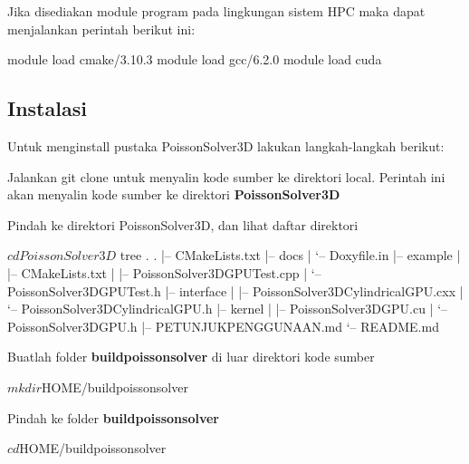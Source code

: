 Jika disediakan module program pada lingkungan sistem H\+PC maka dapat menjalankan perintah berikut ini\+:


\begin{DoxyCode}
module load cmake/3.10.3
module load gcc/6.2.0
module load cuda
\end{DoxyCode}
 \subsection*{Instalasi}

Untuk menginstall pustaka Poisson\+Solver3D lakukan langkah-\/langkah berikut\+:


\begin{DoxyEnumerate}
\item Jalankan git clone untuk menyalin kode sumber ke direktori local. Perintah ini akan menyalin kode sumber ke direktori {\bfseries Poisson\+Solver3D} 

\item Pindah ke direktori Poisson\+Solver3D, dan lihat daftar direktori 
\begin{DoxyCode}
$ cd PoissonSolver3D
$ tree .
.
|-- CMakeLists.txt
|-- docs
|   `-- Doxyfile.in
|-- example
|   |-- CMakeLists.txt
|   |-- PoissonSolver3DGPUTest.cpp
|   `-- PoissonSolver3DGPUTest.h
|-- interface
|   |-- PoissonSolver3DCylindricalGPU.cxx
|   `-- PoissonSolver3DCylindricalGPU.h
|-- kernel
|   |-- PoissonSolver3DGPU.cu
|   `-- PoissonSolver3DGPU.h
|-- PETUNJUKPENGGUNAAN.md
`-- README.md
\end{DoxyCode}

\item Buatlah folder {\bfseries buildpoissonsolver} di luar direktori kode sumber 
\begin{DoxyCode}
$ mkdir $HOME/buildpoissonsolver
\end{DoxyCode}

\item Pindah ke folder {\bfseries buildpoissonsolver}
\end{DoxyEnumerate}


\begin{DoxyCode}
$ cd $HOME/buildpoissonsolver
\end{DoxyCode}

